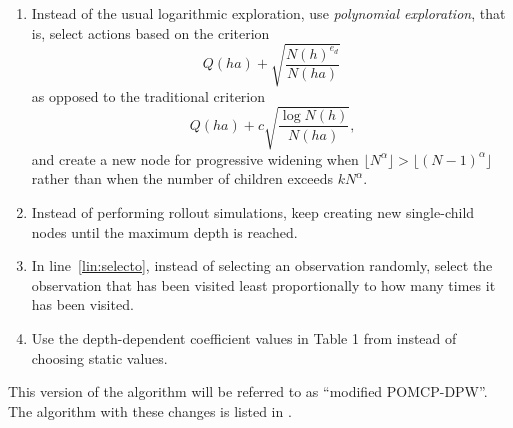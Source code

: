 \begin{enumerate}
    \item Instead of the usual logarithmic exploration, use \emph{polynomial exploration}, that is, select actions based on the criterion
    \begin{equation}
        Q(ha) + \sqrt{\frac{N(h)^{e_d}}{N(ha)}}
    \end{equation}
    as opposed to the traditional criterion
    \begin{equation}
        Q(ha) + c \sqrt{\frac{\log N(h)}{N(ha)}}\text{,}
    \end{equation}
    and create a new node for progressive widening when $\lfloor N^\alpha \rfloor > \lfloor (N-1)^\alpha \rfloor$ rather than when the number of children exceeds $k N^\alpha$.

    \item Instead of performing rollout simulations, keep creating new single-child nodes until the maximum depth is reached.

    \item In line~\ref{lin:selecto}, instead of selecting an observation randomly, select the observation that has been visited least proportionally to how many times it has been visited.

    \item Use the depth-dependent coefficient values in Table 1 from \citet{auger2013continuous} instead of choosing static values.
\end{enumerate}

This version of the algorithm will be referred to as ``modified POMCP-DPW''. The algorithm with these changes is listed in .

